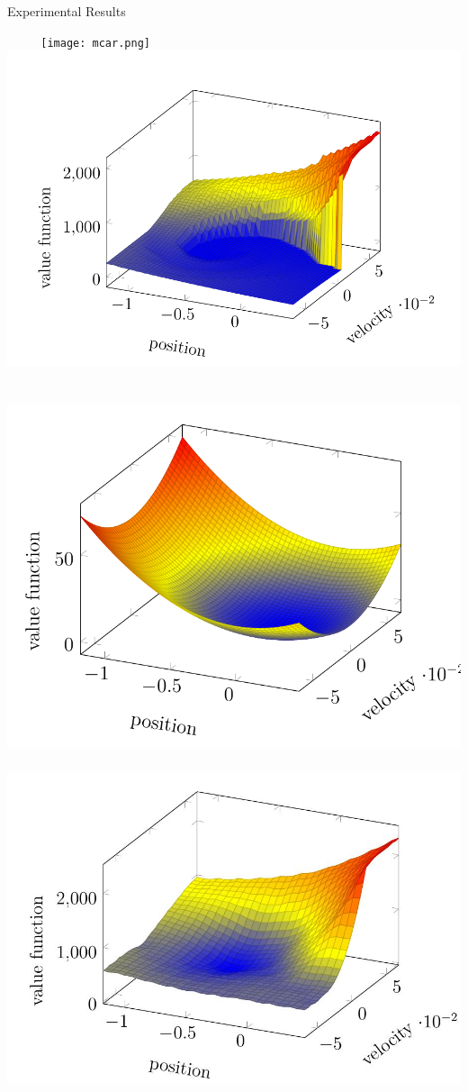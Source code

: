 \documentclass[10pt]{beamer}
\begin{document}
\begin{frame}{Experimental Results}
\begin{block}{}
$\mbox{ }$
$\mbox{ }$$\mbox{ }$
\texttt{[image: mcar.png]}
$\mbox{ }$
\includegraphics[scale=0.21]{actval.jpeg}\\
$\mbox{ }$\\
$\mbox{ }$
\includegraphics[scale=0.21]{basisval.jpeg}
$\mbox{ }$
\includegraphics[scale=0.19]{appval.jpeg}
\end{block}
\end{frame}
\end{document}
